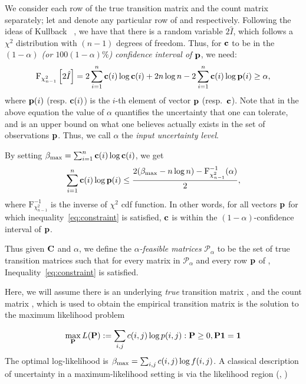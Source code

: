 We consider each row of the true transition matrix and the count matrix
separately; let {\rowp} and {\rowc} denote
any particular row of {\truetransitionmatrix} and {\countmatrix} respectively.  
Following the ideas of Kullback {\etal}~\cite{kullback62tests}, we have that 
there is a random variable $2\hat{I}$, which follows a $\chi^2$ distribution with $(n-1)$ degrees of freedom.
Thus, 
for $\mathbf{c}$ to be in the  \emph{$(1-\alpha)$ (or $100(1-\alpha)\%$) 
confidence interval of $\mathbf{p}$}, we need:
\begin{equation*}\label{eq:ul}
\text{F}_{\chi^2_{n-1}}\left[2\hat{I}\right] =  2\sum_{i=1}^n\mathbf{c}(i)\log\mathbf{c}(i)+2n\log n -2\sum_{i=1}^n\mathbf{c}(i)\log\mathbf{p}(i) \geq \alpha,
\end{equation*}
where 
 $\mathbf{p}(i)$ (resp. $\mathbf{c}(i)$) is the $i$-th element of vector $\mathbf{p}$ (resp.\ $\mathbf{c}$).
 Note that in the above equation the value of $\alpha$ quantifies the uncertainty that
 one can tolerate, and is an upper bound on what one believes actually exists in the set of observations $\mathbf{p}$. 
Thus, we call $\alpha$ the \emph{input uncertainty level}.
 
By setting $\beta_\text{max} = \sum_{i=1}^n\mathbf{c}(i)\log \mathbf{c}(i)$,
we get
\begin{equation}\label{eq:constraint}
\sum_{i=1}^n\mathbf{c}(i)\log\mathbf{p}(i) \leq \frac{2(\beta_\text{max}-n\log n)-\text{F}^{-1}_{\chi^2_{n-1}}(\alpha)}{2},
\end{equation}
where $\text{F}^{-1}_{\chi^2_{n-1}}$ is the inverse of $\chi^2$ cdf function. 
In other words, for all vectors $\mathbf{p}$ for which inequality~\eqref{eq:constraint}
is satisfied, $\mathbf{c}$ is within the $(1-\alpha)$-confidence interval of $\mathbf{p}$.

Thus given ${\mathbf{C}}$ and $\alpha$, we define 
the \emph{$\alpha$-feasible
matrices} $\mathcal{P}_{\alpha}$ to be 
the 
set of true transition matrices  such that
for every matrix {\truetransitionmatrix} in $\mathcal{P}_{\alpha}$
and every row $\mathbf{p}$ of {\truetransitionmatrix}, Inequality~\eqref{eq:constraint}
is satisfied.



\iffalse
{}
Here, we will assume there is an underlying \emph{true} transition matrix
{\truetransitionmatrix}, and the count matrix {\countmatrix}, which is used to 
obtain the empirical transition matrix {\empiricaltransitionmatrix} is the solution
to the maximum likelihood problem

\begin{equation}
\max_{\mathbf{P}} L({\mathbf{P}}) := \sum_{i,j}c(i,j) \log{p(i,j)} : {\mathbf{P}} \geq 0, {\mathbf{P}}\mathbf{1} = \mathbf{1} 
\end{equation}
The optimal log-likelihood is $\beta_{\textrm{max}}= \sum_{i,j}c(i,j)\log{f(i,j)}$.
A classical description of uncertainty in a maximum-likelihood setting is via the likelihood region (\citet{lehmann2006theory}, \citet{poor2013introduction})

